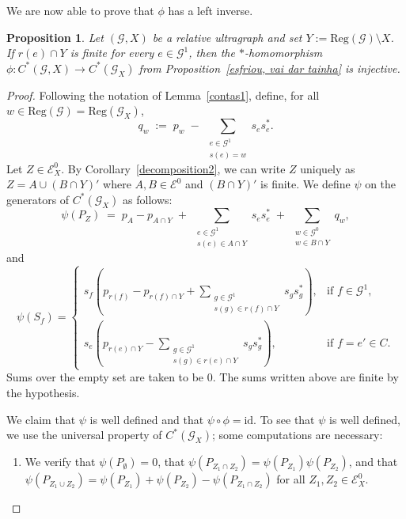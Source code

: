 \documentclass[12pt, reqno]{amsart}
\newtheorem{proposition}[theorem]{Proposition}
\theoremstyle{definition}
\theoremstyle{remark}
\numberwithin{equation}{section}
\begin{document}
We are now able to prove that $\phi$ has a left inverse.

\begin{proposition}\label{isomorphismrelative}
Let $(\mathcal{G},X)$ be a relative ultragraph and set
$Y:=\mathrm{Reg}(\mathcal{G})\setminus X$. If $r(e)\cap Y$ is finite for every
$e\in\mathcal{G}^1$, then the $*$-homomorphism
$\phi: C^*(\mathcal{G},X)\to C^*(\mathcal{G}_X)$ from
Proposition~\ref{esfriou, vai dar tainha} is injective.
\end{proposition}
\begin{proof}
Following the notation of Lemma~\ref{contas1}, define, for all
$w \in \mathrm{Reg}(\mathcal{G})=\mathrm{Reg}(\mathcal{G}_X)$,
\[
q_w \;:=\; p_w \;-\; \sum_{\substack{e \in \mathcal{G}^1 \\ s(e)=w}} s_e s_e^* .
\]
Let $Z \in \mathcal{E}_X^0$. By Corollary~\ref{decomposition2}, we can write $Z$ uniquely as
$Z = A \cup (B \cap Y)'$ where $A,B \in \mathcal{E}^0$ and $(B \cap Y)'$ is finite. We define $\psi$
on the generators of $C^*(\mathcal{G}_X)$ as follows:
\[
\psi(P_Z)
\;=\;
p_A - p_{A \cap Y}
\;+\;
\sum_{\substack{e \in \mathcal{G}^1 \\ s(e) \in A \cap Y}} s_e s_e^*
\;+\;
\sum_{\substack{w \in \mathcal{G}^0 \\ w \in B \cap Y}} q_w,
\]
and
\[
\psi(S_f)
=
\begin{cases}
\displaystyle
s_f \!\left(
p_{r(f)}
-
p_{r(f)\cap Y}
+
\sum_{\substack{g \in \mathcal{G}^1 \\ s(g) \in r(f)\cap Y}}
s_g s_g^*
\right),
& \text{if } f \in \mathcal{G}^1, \\[10pt]
\displaystyle
s_e \!\left(
p_{r(e)\cap Y}
-
\sum_{\substack{g \in \mathcal{G}^1 \\ s(g) \in r(e)\cap Y}}
s_g s_g^*
\right),
& \text{if } f=e' \in C.
\end{cases}
\]
Sums over the empty set are taken to be $0$. The sums written above are finite by the hypothesis.

We claim that $\psi$ is well defined and that $\psi \circ \phi = \mathrm{id}$. To see that $\psi$ is
well defined, we use the universal property of $C^*(\mathcal{G}_X)$; some computations are necessary:

\begin{enumerate}
\item We verify that $\psi(P_\emptyset)=0$, that
$\psi(P_{Z_1 \cap Z_2}) = \psi(P_{Z_1}) \psi(P_{Z_2})$, and that
$\psi(P_{Z_1\cup Z_2})= \psi(P_{Z_1})+\psi(P_{Z_2})-\psi(P_{Z_1\cap Z_2})$ for all
$Z_1, Z_2 \in \mathcal{E}_X^0$.


\end{enumerate}
\end{proof}
\end{document}
